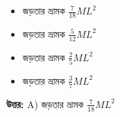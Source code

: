 \documentclass[12pt, a4paper]{article}
\begin{document}
\begin{itemize}[label={}, leftmargin=1cm, itemsep=0.5em]
    \item[\textbf{A)}] জড়তার ভ্রামক $\frac{7}{18} M L^2$
    \item[\textbf{B)}] জড়তার ভ্রামক $\frac{5}{12} M L^2$
    \item[\textbf{C)}] জড়তার ভ্রামক $\frac{2}{5} M L^2$
    \item[\textbf{D)}] জড়তার ভ্রামক $\frac{3}{7} M L^2$
\end{itemize}

\vspace{0.5em}
\begin{tcolorbox}[answerbox]
    \textbf{\color{success} উত্তর:} A) জড়তার ভ্রামক $\frac{7}{18} M L^2$
\end{tcolorbox}
\vspace{1em}
\end{document}

